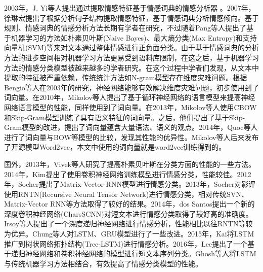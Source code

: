 \documentclass[a4paper,AutoFakeBold,oneside,12pt]{book}
\begin{document}
2003年，J. Yi等人提出通过提取情感特征基于情感词典的情感分析器 \cite{yiSentimentAnalyzerExtracting2003}。2007年，徐琳宏提出了根据分析句子结构提取情感特征，基于情感词典分析情感倾向\cite{xulinhongJiYuYuYiZiYuanDeWenBenQingGanJiSuan2007}。基于规则、情感词典的情感分析方法长期有学者在研究，不过随着Pang等人提出了基于机器学习的方法如朴素贝叶斯(Naive Bayes)、最大熵分类(Max Entropy)和支持向量机(SVM)等来对文本通过整体情感进行正负面分类\cite{pangThumbsSentimentClassification2002}。由于基于情感词典的分析方法的进步空间相对机器学习方法更易受到语料库限制，在这之后，基于机器学习方法的情感分类模型被越来越多的学者研究。在这个过程中学者们发现，从文本中提取的特征被严重依赖，传统统计方法如N-gram模型存在维度灾难问题。根据Bengio等人在2003年的研究，神经网络能够有效解决维度灾难问题，初步使用到了词向量\cite{bengioNeuralProbabilisticLanguage2003}。在2010年，Mikolov等人提出了基于循环神经网络的语言模型来提高神经网络语言模型的性能，同样使用到了词向量\cite{mikolovRecurrentNeuralNetwork}。在2013年，Mikolov等人使用CBOW和Skip-Gram模型训练了具有语义特征的词向量\cite{mikolovEfficientEstimationWord2013}。之后，他们提出了基于Skip-Gram模型的改进，提出了词向量蕴含大量语法、语义的观点\cite{mikolovDistributedRepresentationsWords2013a}。2014年，Quoc等人进行了词向量与BOW等模型的比较，发现其性能的优异性\cite{leDistributedRepresentationsSentences}。Mikolov等人后来发布了开源模型Word2vec，本文中使用的词向量就是word2vec训练得到的。

国外，2013年，Vivek等人研究了提高朴素贝叶斯在分类方面的性能的一些方法\cite{narayananFastAccurateSentiment2013}。2014年，Kim提出了使用卷积神经网络训练模型进行情感分类，性能较佳\cite{kimConvolutionalNeuralNetworks2014a}。2012年，Socher提出了Matrix-Vector RNN模型进行情感分类\cite{socherSemanticCompositionalityRecursive}。2013年，Socher对影评使用RNTN(Recursive Neural Tensor Network)进行情感分类，相对传统SVN、Matrix-Vector RNN等方法取得了较好的结果\cite{socherRecursiveDeepModels2013}。2014年，dos Santos提出一个新的深度卷积神经网络(CharsSCNN)对短文本进行情感分类取得了较好高的准确度\cite{dossantosDeepConvolutionalNeural2014}。Irsoy等人提出了一个深度递归神经网络进行情感分析，性能相比以往RNTN等较为优异\cite{irsoyDeepRecursiveNeural2014}。Chung等人对LSTM、GRU模型进行了一些改进\cite{chungEmpiricalEvaluationGated2014}。2015年，Kai将LSTM推广到树状网络拓扑结构(Tree-LSTM)进行情感分析\cite{taiImprovedSemanticRepresentations2015}。2016年，Lee提出了一个基于递归神经网络和卷积神经网络的模型进行短文本序列分类\cite{leeSequentialShortTextClassification2016}。Ghosh等人将LSTM与传统机器学习方法相结合，有效提高了情感分类模型的性能\cite{ghoshDocumentModelingHierarchical2018}。
\end{document}
